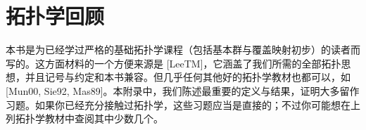 \documentclass[../main.tex]{subfiles}
\begin{document}
\chapter{拓扑学回顾}\label{chapter:appA-topology-review}

本书是为已经学过严格的基础拓扑学课程（包括基本群与覆盖映射初步）的读者而写的。这方面材料的一个方便来源是 [LeeTM]，它涵盖了我们所需的全部拓扑思想，并且记号与约定和本书兼容。但几乎任何其他好的拓扑学教材也都可以，如 [Mun00, Sie92, Mas89]。本附录中，我们陈述最重要的定义与结果，证明大多留作习题。如果你已经充分接触过拓扑学，这些习题应当是直接的；不过你可能想在上列拓扑学教材中查阅其中少数几个。






\end{document}
